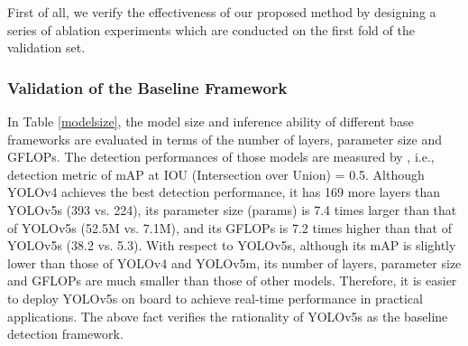 First of all, we verify the effectiveness of our proposed method by designing a series of ablation experiments which are conducted on the first fold of the validation set.





\subsubsection{\textbf{Validation of the Baseline Framework}} 
In Table \ref{modelsize}, the model size and inference ability of different base frameworks are evaluated in terms of the number of layers, parameter size and GFLOPs. The detection performances of those models are measured by , i.e., detection metric of mAP at IOU (Intersection over Union) = 0.5. Although YOLOv4 achieves the best detection performance, it has 169 more layers than YOLOv5s (393 vs. 224), its parameter size (params) is 7.4 times larger than that of YOLOv5s (52.5M vs. 7.1M), and its GFLOPs is 7.2 times higher than that of YOLOv5s (38.2 vs. 5.3). With respect to YOLOv5s, although its mAP is slightly lower than those of YOLOv4 and YOLOv5m, its number of layers, parameter size and GFLOPs are much smaller than those of other models. Therefore, it is easier to deploy YOLOv5s on board to achieve real-time performance in practical applications. The above fact verifies the rationality of YOLOv5s as the baseline detection framework.



